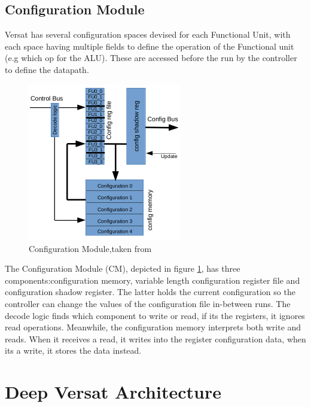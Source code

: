 \newpage
\subsection{Configuration Module}
\quad Versat has several configuration spaces devised for each Functional Unit,
with each space having multiple fields to define the operation of the Functional unit (e.g which op for the ALU).
These are accessed before the run by the controller to define the datapath.

\begin{figure}[!htbp]
    \centering
    \includegraphics[width=0.6\textwidth]{Figures/conf.png}
    \caption{Configuration Module,taken from~\cite{sousa:controller}}
    \label{figure:conf}
\end{figure} 

The Configuration Module (CM), depicted in figure \ref{figure:conf}, 
has three components:configuration memory, variable length configuration register file 
and configuration shadow register.
The latter holds the current configuration so the controller can change the values of the configuration file in-between runs.
The decode logic finds which component to write or read, if its the registers, it ignores read operations.
Meanwhile, the configuration memory interprets both write and reads. When it receives a read,
it writes into the register configuration data, when its a write, it stores the data instead.


\newpage
\section{Deep Versat Architecture}


